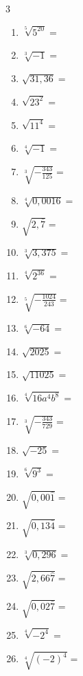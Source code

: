 \documentclass[a4paper,12pt]{article}
\begin{document}
\begin{enumerate}[start=4]
\begin{multicols}{3}
\begin{enumerate}[label=\arabic*)]
        \item $\sqrt[5]{5^{20}} =$
        \item $\sqrt[3]{-1} =$
        \item $\sqrt{31,36} =$
        \item $\sqrt{23^2} =$
        \item $\sqrt{11^4} =$
        \item $\sqrt[4]{-1} =$
        \item $\sqrt[3]{-\frac{343}{125}} =$
        \item $\sqrt[4]{0,0016} =$
        \item $\sqrt{2,\bar{7}} =$
        \item $\sqrt[3]{3,375} =$
        \item $\sqrt[4]{2^{36}} =$
        \item $\sqrt[5]{-\frac{1024}{243}} =$
        \item $\sqrt[6]{-64} =$
        \item $\sqrt{2025} =$
        \item $\sqrt{11025} =$
        \item $\sqrt[4]{16a^4 b^8} =$
        \item $\sqrt[3]{-\frac{343}{729}} =$
        \item $\sqrt{-25} =$
        \item $\sqrt[6]{9^3} =$
        \item $\sqrt{0,00\hat{1}} =$
        \item $\sqrt{0,13\bar{4}} =$
        \item $\sqrt[3]{0,296} =$
        \item $\sqrt{2,66\hat{7}} =$
        \item $\sqrt{0,02\bar{7}} =$
        \item $\sqrt[4]{-2^4} =$
        \item $\sqrt[4]{(-2)^4} =$
    \end{enumerate}
    \end{multicols}


\end{enumerate}
\end{document}
